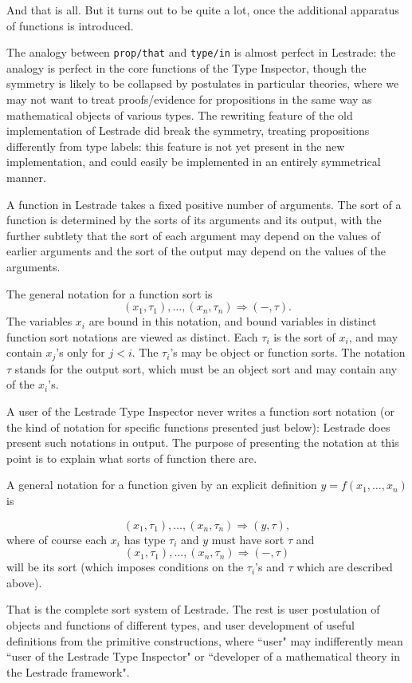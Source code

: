 \documentclass[12pt]{article}
\begin{document}
And that is all.  But it turns out to be quite a lot, once the additional apparatus of functions is introduced.

The analogy between {\tt prop/that} and {\tt type/in} is almost perfect in Lestrade:  the analogy is perfect in the core functions of the Type Inspector,  though the symmetry is likely to be collapsed by
postulates in particular theories, where we may not want to treat proofs/evidence for propositions in the same way as mathematical objects of various types.   The rewriting feature of the old implementation of Lestrade did break the symmetry, treating propositions differently from type labels:  this feature is not yet present in the new implementation, and could easily be implemented in an entirely symmetrical manner.


A function in Lestrade takes a fixed positive number of arguments.  The sort of a function is determined by the sorts of its arguments and its output,
with the further subtlety that the sort of each argument may depend on the values of earlier arguments and the sort of the output may depend on the values of the arguments.

The general notation for a function sort is $$(x_1,\tau_1),\ldots,(x_n,\tau_n)\Rightarrow (-,\tau).$$  The variables $x_i$ are bound in this notation, and bound variables in distinct function sort notations are viewed as distinct.  Each $\tau_i$ is the sort of $x_i$, and may contain $x_j$'s only for $j<i$.  The $\tau_i$'s may be object or function sorts.  The notation $\tau$ stands for the output sort, which must be an object sort and may contain any of the $x_i$'s.

A user of the Lestrade Type Inspector never writes a function sort notation (or the  kind of notation for specific functions presented just below):  Lestrade does present such notations in output.  The purpose of presenting the notation at this point is to explain what sorts of function there are.

A general notation for a function given by an explicit definition $y=f(x_1,\ldots,x_n)$ is

$$(x_1,\tau_1),\ldots,(x_n,\tau_n)\Rightarrow (y,\tau),$$  where of course each $x_i$ has type $\tau_i$ and $y$ must have sort $\tau$ and $$(x_1,\tau_1),\ldots,(x_n,\tau_n)\Rightarrow (-,\tau)$$ will be its sort (which imposes conditions on the $\tau_i$'s and $\tau$ which are described above).

That is the complete sort system of Lestrade.  The rest is user postulation of objects and functions of different types, and user development of useful definitions from the primitive constructions, where ``user" may indifferently mean ``user of the Lestrade Type Inspector" or ``developer of a mathematical theory in the Lestrade framework".
\end{document}
